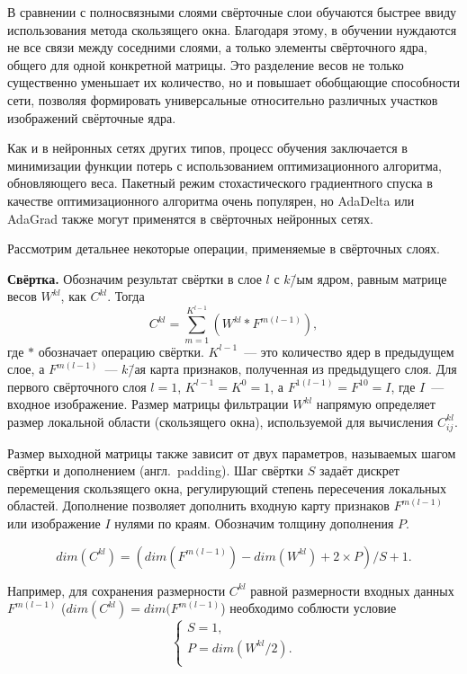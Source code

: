 В сравнении с полносвязными слоями свёрточные слои обучаются быстрее ввиду использования метода скользящего окна. Благодаря этому, в обучении нуждаются не все связи между соседними слоями, а только элементы свёрточного ядра, общего для одной конкретной матрицы. Это разделение весов не только существенно уменьшает их количество, но и повышает обобщающие способности сети, позволяя формировать универсальные относительно различных участков изображений свёрточные ядра.

Как и в нейронных сетях других типов, процесс обучения заключается в минимизации функции потерь с использованием оптимизационного алгоритма, обновляющего веса. Пакетный режим стохастического градиентного спуска в качестве оптимизационного алгоритма очень популярен, но AdaDelta или AdaGrad также могут применятся в свёрточных нейронных сетях. 

Рассмотрим детальнее некоторые операции, применяемые в свёрточных слоях.

\textbf{Свёртка.} Обозначим результат свёртки в слое $ l $ с $ k $\=/ым ядром, равным матрице весов $ W^{kl} $, как $ C^{kl} $. Тогда
\begin{equation*}
C^{kl} = \sum_{m = 1}^{K^{l - 1}} (W^{kl} * F^{m(l - 1)}),
\end{equation*}
где $ * $ обозначает операцию свёртки. $ K^{l - 1} $~--- это количество ядер в предыдущем слое, а $ F^{m(l - 1)} $~--- $ k $\=/ая карта признаков, полученная из предыдущего слоя. Для первого свёрточного слоя $ l = 1 $, $ K^{l - 1} = K^0 = 1 $, а $ F^{1(l - 1)} = F^{10} = I $, где $ I $~--- входное изображение. Размер матрицы фильтрации $ W^{kl} $ напрямую определяет размер локальной области (скользящего окна), используемой для вычисления $ C^{kl}_{ij} $.

Размер выходной матрицы также зависит от двух параметров, называемых шагом свёртки и дополнением (англ.~padding). Шаг свёртки $ S $ задаёт дискрет перемещения скользящего окна, регулирующий степень пересечения локальных областей. Дополнение позволяет дополнить входную карту признаков $ F^{m(l - 1)} $ или изображение $ I $ нулями по краям. Обозначим толщину дополнения $ P $.

\begin{equation*}
dim(C^{kl}) = (dim(F^{m(l - 1)}) - dim(W^{kl}) + 2 \times P) / S + 1.
\end{equation*}

Например, для сохранения размерности $ C^{kl} $ равной размерности входных данных $ F^{m(l - 1)} $ ($ dim(C^{kl}) = dim(F^{m(l - 1)} $) необходимо соблюсти условие
\begin{equation*}
\begin{cases}
S = 1, \\
P = dim(W^{kl}/2). \\
\end{cases}
\end{equation*}

